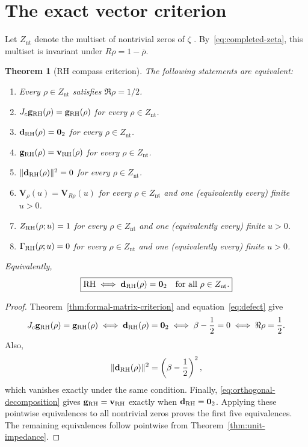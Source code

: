 \documentclass[11pt]{article}
\newtheorem{theorem}[definition]{Theorem}
\newcommand{\Znt}{Z_{\mathrm{nt}}}
\newcommand{\vzero}{\mathbf 0}
\begin{document}
\section{The exact vector criterion}
Let $\Znt$ denote the multiset of nontrivial zeros of $\zeta$
\cite{Titchmarsh,DLMFzeros}.  By~\eqref{eq:completed-zeta}, this multiset is invariant under
$R\rho=1-\overline\rho$.

\begin{theorem}[RH compass criterion]\label{thm:criterion}
The following statements are equivalent:
\begin{enumerate}
 \item Every $\rho\in\Znt$ satisfies $\Re\rho=1/2$.
 \item $J_c\mathbf g_{\rm RH}(\rho)=\mathbf g_{\rm RH}(\rho)$ for every
 $\rho\in\Znt$.
 \item $\mathbf d_{\rm RH}(\rho)=\vzero_2$ for every $\rho\in\Znt$.
 \item $\mathbf g_{\rm RH}(\rho)=\mathbf v_{\rm RH}(\rho)$ for every
 $\rho\in\Znt$.
 \item $\|\mathbf d_{\rm RH}(\rho)\|^2=0$ for every $\rho\in\Znt$.
 \item $\mathbf V_\rho(u)=\mathbf V_{R\rho}(u)$ for every $\rho\in\Znt$ and one
 (equivalently every) finite $u>0$.
 \item $Z_{\rm RH}(\rho;u)=1$ for every $\rho\in\Znt$ and one
 (equivalently every) finite $u>0$.
 \item $\Gamma_{\rm RH}(\rho;u)=0$ for every $\rho\in\Znt$ and one
 (equivalently every) finite $u>0$.
\end{enumerate}
Equivalently,
\begin{equation}\label{eq:boxed-criterion}
 \boxed{\mathrm{RH}\iff
 \mathbf d_{\rm RH}(\rho)=\vzero_2\quad\text{for all }\rho\in\Znt.}
\end{equation}
\end{theorem}

\begin{proof}
Theorem~\ref{thm:formal-matrix-criterion} and equation~\eqref{eq:defect} give
\begin{equation}
 J_c\mathbf g_{\rm RH}(\rho)=\mathbf g_{\rm RH}(\rho)
 \iff
 \mathbf d_{\rm RH}(\rho)=\vzero_2
 \iff \beta-\frac12=0
 \iff \Re\rho=\frac12.
\end{equation}
Also,
\begin{equation}
 \|\mathbf d_{\rm RH}(\rho)\|^2
 =\left(\beta-\frac12\right)^2,
\end{equation}
which vanishes exactly under the same condition.  Finally,
\eqref{eq:orthogonal-decomposition} gives
$\mathbf g_{\rm RH}=\mathbf v_{\rm RH}$ exactly when
$\mathbf d_{\rm RH}=\vzero_2$.  Applying these pointwise equivalences to all nontrivial
zeros proves the first five equivalences.  The remaining equivalences follow pointwise from
Theorem~\ref{thm:unit-impedance}.
\end{proof}
\end{document}

